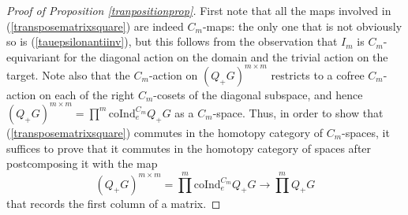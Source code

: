 \documentclass[a4paper, oneside]{amsart}
\newcommand{\1}{\mathds{1}}
\theoremstyle{remark}
\theoremstyle{definition}
\numberwithin{equation}{section}
\begin{document}
\begin{proof}[Proof of Proposition \ref{tranpositionprop}] First note that all the maps involved in (\ref{transposematrixsquare}) are indeed $C_m$-maps: the only one that is not obviously so is (\ref{tauepsilonantiinv}), but this follows from the observation that $I_m$ is $C_m$-equivariant for the diagonal action on the domain and the trivial action on the target. Note also that the $C_m$-action on $(Q_+G)^{m\times m}$ restricts to a cofree $C_m$-action on each of the right $C_m$-cosets of the diagonal subspace, and hence $(Q_+G)^{m\times m}=\prod^m\mathrm{coInd}_{e}^{C_m}Q_+G$ as a $C_m$-space. Thus, in order to show that (\ref{transposematrixsquare}) commutes in the homotopy category of $C_m$-spaces, it suffices to prove that it commutes in the homotopy category of spaces after postcomposing it with the map
$$
(Q_+G)^{m\times m}=\prod^m\mathrm{coInd}_{e}^{C_m}Q_+G\longrightarrow \prod^mQ_+G
$$
that records the first column of a matrix.


\end{proof}
\end{document}
